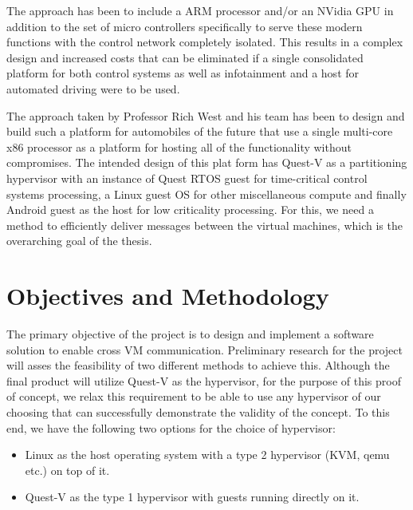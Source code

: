 \documentclass[12pt]{article}
\begin{document}
The approach has been to include a ARM processor and/or an NVidia GPU in addition to the set of micro controllers specifically to serve these modern functions with the control network completely isolated. This results in a complex design and increased costs that can be eliminated if a single consolidated platform for both control systems as well as infotainment and a host for automated driving were to be used.

The approach taken by Professor Rich West and his team has been to design and build such a platform for automobiles of the future that use a single multi-core x86 processor as a platform for hosting all of the functionality without compromises. The intended design of this plat form has Quest-V as a partitioning hypervisor with an instance of Quest RTOS guest for time-critical control systems processing, a Linux guest OS for other miscellaneous compute and finally Android guest as the host for low criticality processing. For this, we need a method to efficiently deliver messages between the virtual machines, which is the overarching goal of the thesis.


\section{Objectives and Methodology}
The primary objective of the project is to design and implement a software solution to enable cross VM communication. Preliminary research for the project will asses the feasibility of two different methods to achieve this. Although the final product will utilize Quest-V as the hypervisor, for the purpose of this proof of concept, we relax this requirement to be able to use any hypervisor of our choosing that can successfully demonstrate the validity of the concept. To this end, we have the following two options for the choice of hypervisor:

\begin{itemize}
	\item Linux as the host operating system with a type 2 hypervisor (KVM, qemu etc.) on top of it.
	\item Quest-V as the type 1 hypervisor with guests running directly on it.
\end{itemize} 
\end{document}
